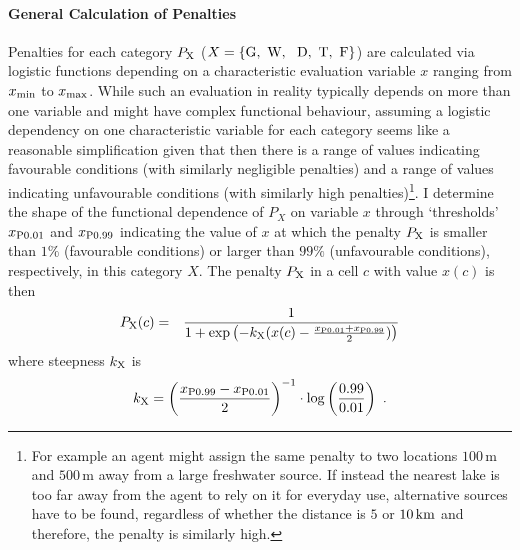 \paragraph{General Calculation of Penalties}
Penalties for each category $P_{\rm X}$ ($X=\{\text{G,\, W, \, D,\, T,\, F}\}$) are calculated via logistic functions depending on a characteristic evaluation variable $x$ ranging from $x_{\rm min}$ to $x_{\rm max}$.
While such an evaluation in reality typically depends on more than one variable and might have complex functional behaviour, assuming a logistic dependency on one characteristic variable for each category seems like a reasonable simplification given that then there is a range of values indicating favourable conditions (with similarly negligible penalties) and a range of values indicating unfavourable conditions (with similarly high penalties)\footnote{For example an agent might assign the same penalty to two locations $100\, \text{m}$ and $500\, \text{m}$ away from a large freshwater source. If instead the nearest lake is too far away from the agent to rely on it for everyday use, alternative sources have to be found, regardless of whether the distance is $5$ or $10\, {\rm km}$ and therefore, the penalty is similarly high.}.
I determine the shape of the functional dependence of $P_X$ on variable $x$ through `thresholds' $x_{\rm P0.01}$ and $x_{\rm P0.99}$ indicating the value of $x$ at which the penalty $P_{\rm X}$ is smaller than $1\%$ (favourable conditions) or larger than $99\%$ (unfavourable conditions), respectively, in this category $X$.
The penalty $P_{\rm X}$ in a cell $c$ with value $x(c)$ is then
\begin{eqnarray}\label{eq:P_X(c)}
	P_{\rm X}(c) & = & \frac{1}{1+\exp\left( - k_{\rm X} (x(c)-\frac{x_{\rm P0.01}+x_{\rm P0.99}}{2}) \right)} %
\end{eqnarray}
where steepness $k_{\rm X}$ is 
\begin{equation}\label{eq:k}
k_{\rm X} = \left(\frac{x_{\rm P0.99}-{x_{\rm P0.01}}}{2}\right)^{-1} \cdot \log\left(\frac{0.99}{0.01}\right) \ .
\end{equation}
